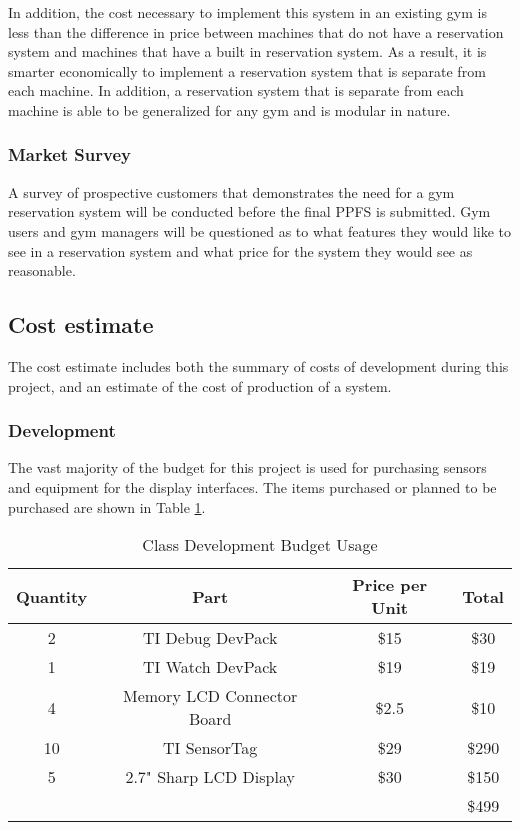 \documentclass[PPFS.tex]{template/subfiles}
\begin{document}
        In addition, the cost necessary to implement this system in an existing gym is less than the difference in price between machines that do not have a reservation system and machines that have a built in reservation system. As a result, it is smarter economically to implement a reservation system that is separate from each machine. In addition, a reservation system that is separate from each machine is able to be generalized for any gym and is modular in nature.%
        
        \subsubsection{Market Survey}
        
        A survey of prospective customers that demonstrates the need for a gym reservation system will be conducted before the final PPFS is submitted. Gym users and gym managers will be questioned as to what features they would like to see in a reservation system and what price for the system they would see as reasonable.
        
        
    \subsection{Cost estimate}
    The cost estimate includes both the summary of costs of development during this project, and an estimate of the cost of production of a system.
    
        \subsubsection{Development}
        The vast majority of the budget for this project is used for purchasing sensors and equipment for the display interfaces. The items purchased or planned to be purchased are shown in Table \ref{tab:devPartCost}.
        \begin{table}[H]
        	\begin{center}
        		\caption{Class Development Budget Usage}
        		\label{tab:devPartCost}
        		\begin{tabular}{|c|c|c|c|}
        			\hline
        			Quantity & Part & Price per Unit & Total\\
        			\hline
        			2 & TI Debug DevPack & \$15 & \$30\\
        			\hline
        			1 & TI Watch DevPack & \$19 & \$19\\
        			\hline
        			4 & Memory LCD Connector Board & \$2.5 & \$10\\
        			\hline
        			10 & TI SensorTag & \$29 & \$290\\
        			\hline
        			5 & 2.7" Sharp LCD Display & \$30 & \$150\\
        			\hline
        			&&& \$499\\
        			\hline
        		\end{tabular}
        	\end{center}
        \end{table}
        
\end{document}
